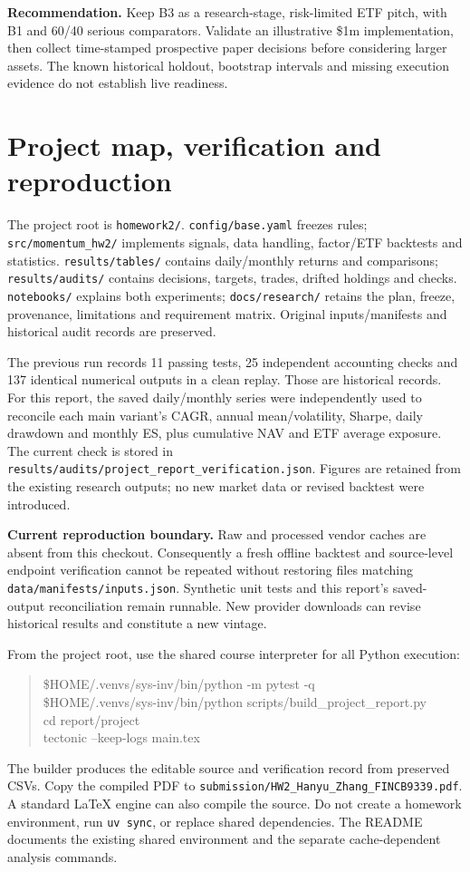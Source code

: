 \documentclass[11pt]{article}
\begin{document}
\textbf{Recommendation.} Keep B3 as a research-stage, risk-limited ETF pitch, with B1 and 60/40 serious comparators. Validate an illustrative \$1m implementation, then collect time-stamped prospective paper decisions before considering larger assets. The known historical holdout, bootstrap intervals and missing execution evidence do not establish live readiness.
\clearpage
\section{Project map, verification and reproduction}
The project root is \texttt{homework2/}. \texttt{config/base.yaml} freezes rules; \texttt{src/momentum\_hw2/} implements signals, data handling, factor/ETF backtests and statistics. \texttt{results/tables/} contains daily/monthly returns and comparisons; \texttt{results/audits/} contains decisions, targets, trades, drifted holdings and checks. \texttt{notebooks/} explains both experiments; \texttt{docs/research/} retains the plan, freeze, provenance, limitations and requirement matrix. Original inputs/manifests and historical audit records are preserved.

The previous run records 11 passing tests, 25 independent accounting checks and 137 identical numerical outputs in a clean replay. Those are historical records. For this report, the saved daily/monthly series were independently used to reconcile each main variant's CAGR, annual mean/volatility, Sharpe, daily drawdown and monthly ES, plus cumulative NAV and ETF average exposure. The current check is stored in \texttt{results/audits/project\_report\_verification.json}. Figures are retained from the existing research outputs; no new market data or revised backtest were introduced.

\textbf{Current reproduction boundary.} Raw and processed vendor caches are absent from this checkout. Consequently a fresh offline backtest and source-level endpoint verification cannot be repeated without restoring files matching \texttt{data/manifests/inputs.json}. Synthetic unit tests and this report's saved-output reconciliation remain runnable. New provider downloads can revise historical results and constitute a new vintage.

From the project root, use the shared course interpreter for all Python execution:
\begin{quote}\small\ttfamily
\$HOME/.venvs/sys-inv/bin/python -m pytest -q\\
\$HOME/.venvs/sys-inv/bin/python scripts/build\_project\_report.py\\
cd report/project\\
tectonic --keep-logs main.tex
\end{quote}
The builder produces the editable source and verification record from preserved CSVs. Copy the compiled PDF to \texttt{submission/HW2\_Hanyu\_Zhang\_FINCB9339.pdf}. A standard LaTeX engine can also compile the source. Do not create a homework environment, run \texttt{uv sync}, or replace shared dependencies. The README documents the existing shared environment and the separate cache-dependent analysis commands.
\end{document}
